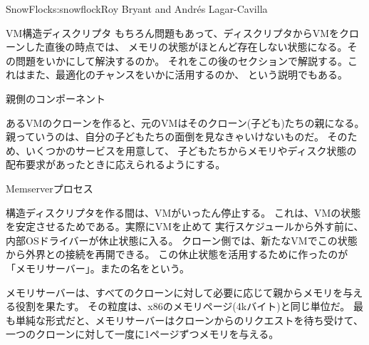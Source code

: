\begin{aosachapter}{SnowFlock}{s:snowflock}{Roy Bryant and Andr\'e{s} Lagar-Cavilla}
\begin{aosasect1}{VM構造ディスクリプタ}
もちろん問題もあって、ディスクリプタからVMをクローンした直後の時点では、
メモリの状態がほとんど存在しない状態になる。その問題をいかにして解決するのか。
それをこの後のセクションで解説する。これはまた、最適化のチャンスをいかに活用するのか、
という説明でもある。

\end{aosasect1}

\begin{aosasect1}{親側のコンポーネント}

あるVMのクローンを作ると、元のVMはそのクローン(子ども)たちの親になる。
親っていうのは、自分の子どもたちの面倒を見なきゃいけないものだ。
そのため、いくつかのサービスを用意して、
子どもたちからメモリやディスク状態の配布要求があったときに応えられるようにする。

\begin{aosasect2}{Memserverプロセス}

構造ディスクリプタを作る間は、VMがいったん停止する。
これは、VMの状態を安定させるためである。実際にVMを止めて
実行スケジュールから外す前に、内部OSドライバーが休止状態に入る。
クローン側では、新たなVMでこの状態から外界との接続を再開できる。
この休止状態を活用するために作ったのが「メモリサーバー」。またの名をという。

メモリサーバーは、すべてのクローンに対して必要に応じて親からメモリを与える役割を果たす。
その粒度は、x86のメモリページ(4kバイト)と同じ単位だ。
最も単純な形式だと、メモリサーバーはクローンからのリクエストを待ち受けて、
一つのクローンに対して一度に1ページずつメモリを与える。


\end{aosasect2}
\end{aosasect1}
\end{aosachapter}
